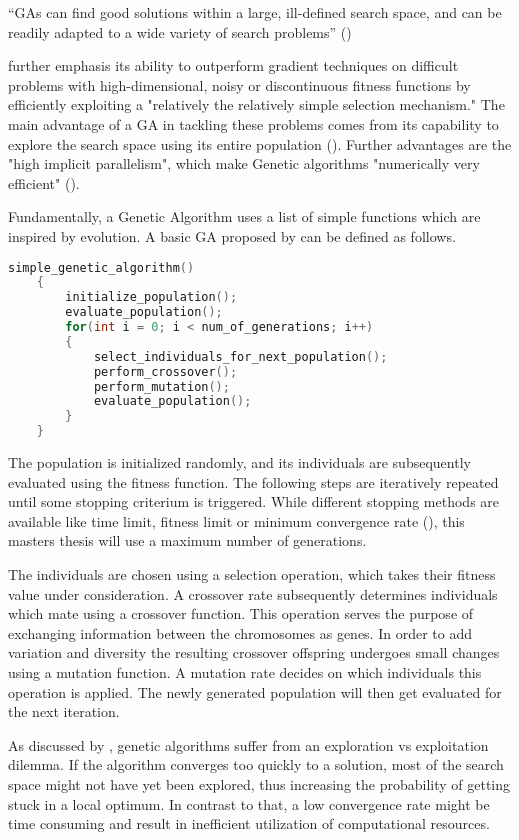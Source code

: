 \enquote{GAs can find good solutions within a large, ill-defined search space, and can be readily adapted to a wide variety of search problems} (\cite{mills_determining_2015})

\cite{grefenstette_optimization_1986} further emphasis its ability to outperform gradient techniques on difficult problems with high-dimensional, noisy or discontinuous fitness functions by efficiently exploiting a "relatively the relatively simple selection mechanism." The main advantage of a GA in tackling these problems comes from its capability to explore the search space using its entire population (\cite{hussain_trade-off_2020}). Further advantages are the "high implicit parallelism", which make Genetic algorithms "numerically very efficient" (\cite{marsili_libelli_adaptive_2000}).

Fundamentally, a Genetic Algorithm uses a list of simple functions which are inspired by evolution. A basic GA proposed by  can be defined as follows.

\begin{lstlisting}[language=C, tabsize=4]
	simple_genetic_algorithm() 
	{
		initialize_population();
		evaluate_population();
		for(int i = 0; i < num_of_generations; i++) 
		{
			select_individuals_for_next_population();
			perform_crossover();
			perform_mutation();
			evaluate_population();
		}
	}
\end{lstlisting}

The population is initialized randomly, and its individuals are subsequently evaluated using the fitness function. The following steps are iteratively repeated until some stopping criterium is triggered. While different stopping methods are available like time limit, fitness limit or minimum convergence rate (\cite{majumdar_genetic_2015}), this masters thesis will use a maximum number of generations.

The individuals are chosen using a selection operation, which takes their fitness value under consideration. A crossover rate subsequently determines individuals which mate using a crossover function. This operation serves the purpose of exchanging information between the chromosomes as genes. In order to add variation and diversity the resulting crossover offspring undergoes small changes using a mutation function. A mutation rate decides on which individuals this operation is applied. The newly generated population will then get evaluated for the next iteration.

As discussed by \cite{hussain_trade-off_2020}, genetic algorithms suffer from an exploration vs exploitation dilemma. If the algorithm converges too quickly to a solution, most of the search space might not have yet been explored, thus increasing the probability of getting stuck in a local optimum.
In contrast to that, a low convergence rate might be time consuming and result in inefficient utilization of computational resources.

